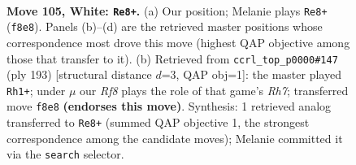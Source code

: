 \documentclass[11pt]{article}
\begin{document}
\clearpage

\begin{figure}[p]\centering
\begin{subfigure}{0.46\textwidth}\centering
\resizebox{\linewidth}{!}{%
\newchessgame
\chessboard[
  setfen={5R2/8/4k3/8/8/r7/6K1/3r4 w - - 20 105},
  showmover=false,
  pgfstyle=straightmove, color=movearrow, markmove={f8-e8}
]}
\caption{}
\end{subfigure}\hfill
\begin{subfigure}{0.46\textwidth}\centering
\resizebox{\linewidth}{!}{%
\newchessgame
\chessboard[
  setfen={1k6/8/8/8/8/2R5/7r/1K6 b - - 25 97},
  showmover=false,
  pgfstyle=straightmove, color=movearrow, markmove={h2-h1}
]}
\caption{}
\end{subfigure}
\\[4pt]

\caption{\textbf{Move 105, White: \texttt{Re8+}.} (a) Our position; Melanie plays \texttt{Re8+} (\texttt{f8e8}). Panels (b)--(d) are the retrieved master positions whose correspondence most drove this move (highest QAP objective among those that transfer to it). (b) Retrieved from \texttt{ccrl\_top\_p0000\#147} (ply 193) [structural distance $d$=3, QAP obj=1]: the master played \texttt{Rh1+}; under $\mu$ our \emph{Rf8} plays the role of that game's \emph{Rh7}; transferred move \texttt{f8e8} \textbf{(endorses this move)}. Synthesis: 1 retrieved analog transferred to \texttt{Re8+} (summed QAP objective 1, the strongest correspondence among the candidate moves); Melanie committed it via the \texttt{search} selector.}
\label{fig:thought-m208}
\end{figure}

\clearpage
\end{document}
